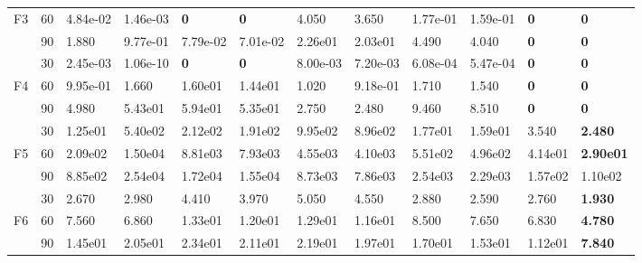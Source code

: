\begin{table}
\begin{center}
\begin{tabular}{p{0.3in} | p{0.4in} | p{0.6in} |  p{0.6in} |  p{0.6in}|  p{0.6in} |  p{0.6in} | p{0.6in} |  p{0.6in} | p{0.6in} |  p{0.6in} |  p{0.6in}}
F3    &    60    &    4.84e-02    &    1.46e-03    &\textbf{    0    }&\textbf{    0    }&    4.050    &    3.650    &    1.77e-01    &    1.59e-01    &    \textbf{    0    }&    \textbf{    0    }\\
    &    90    &    1.880    &    9.77e-01    &    7.79e-02    &{    7.01e-02    }&    2.26e01    &    2.03e01    &    4.490    &    4.040    &    \textbf{    0    }&    \textbf{    0    }\\
\hline
    &    30    &    2.45e-03    &    1.06e-10    &\textbf{    0    }&\textbf{    0    }&    8.00e-03    &    7.20e-03    &    6.08e-04    &    5.47e-04    &    \textbf{    0    }&    \textbf{    0    }\\
F4    &    60    &    9.95e-01    &    1.660    &    1.60e01    &    1.44e01    &    1.020    &{    9.18e-01    }&    1.710    &    1.540    &    \textbf{    0    }&    \textbf{    0    }\\
    &    90    &    4.980    &    5.43e01    &    5.94e01    &    5.35e01    &    2.750    &{    2.480    }&    9.460    &    8.510    &    \textbf{    0    }&    \textbf{    0    }\\        
    \hline                                        
    &    30    &{    1.25e01    }&    5.40e02    &    2.12e02    &    1.91e02    &    9.95e02    &    8.96e02    &    1.77e01    &    1.59e01    &    {    3.540    }&    \textbf{    2.480    }\\
F5        &60    &    2.09e02    &    1.50e04    &    8.81e03    &    7.93e03    &    4.55e03    &    4.10e03    &    5.51e02    &    4.96e02    &    {    4.14e01    }&    \textbf{    2.90e01    }\\
    &    90    &    8.85e02    &    2.54e04    &    1.72e04    &    1.55e04    &    8.73e03    &    7.86e03    &    2.54e03    &    2.29e03    &    {    1.57e02    }&    {    1.10e02    }\\
\hline
    &    30    &{    2.670    }&    2.980    &    4.410    &    3.970    &    5.050    &    4.550    &    2.880    &{    2.590    }&            2.760    &    \textbf{    1.930    }\\
F6    &    60    &    7.560    &{    6.860    }&    1.33e01    &    1.20e01    &    1.29e01    &    1.16e01    &    8.500    &    7.650    &    {    6.830    }&    \textbf{    4.780    }\\
    &    90    &{    1.45e01    }&    2.05e01    &    2.34e01    &    2.11e01    &    2.19e01    &    1.97e01    &    1.70e01    &    1.53e01    &    {    1.12e01    }&    \textbf{    7.840    }\\            

\end{tabular}
\end{center}
\end{table}
